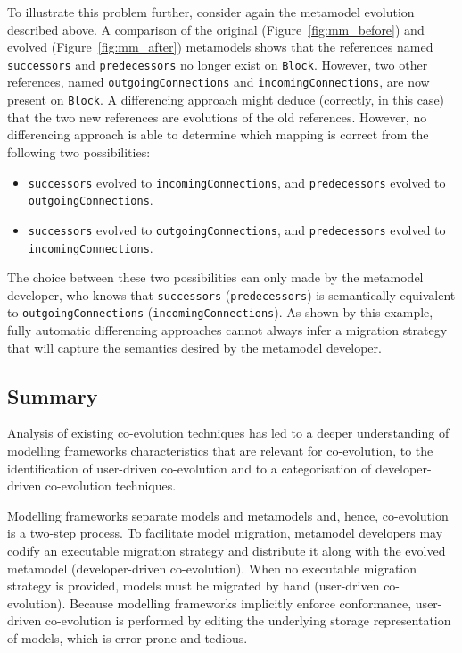 To illustrate this problem further, consider again the metamodel evolution described above. A comparison of the original (Figure~\ref{fig:mm_before}) and evolved (Figure~\ref{fig:mm_after}) metamodels shows that the references named \texttt{successors} and \texttt{predecessors} no longer exist on \texttt{Block}. However, two other references, named \texttt{out\-go\-ingCon\-nect\-ions} and \texttt{incomingConnections}, are now present on \texttt{Block}. A differencing approach might deduce (correctly, in this case) that the two new references are evolutions of the old references. However, no differencing approach is able to determine which mapping is correct from the following two possibilities:

\begin{itemize}
	\item \texttt{successors} evolved to \texttt{incomingConnections}, and \texttt{predecessors} evolved to \texttt{outgoingConnections}.
	\item \texttt{successors} evolved to \texttt{outgoingConnections}, and \texttt{predecessors} evolved to \texttt{incomingConnections}.
\end{itemize}

The choice between these two possibilities can only made by the metamodel developer, who knows that \texttt{successors} (\texttt{predecessors}) is semantically equivalent to \texttt{outgoingConnections} (\texttt{incomingConnections}). As shown by this example, fully automatic differencing approaches cannot always infer a migration strategy that will capture the semantics desired by the metamodel developer.


\subsection{Summary}
Analysis of existing co-evolution techniques has led to a deeper understanding of modelling frameworks characteristics that are relevant for co-evolution, to the identification of user-driven co-evolution and to a categorisation of developer-driven co-evolution techniques.

Modelling frameworks separate models and metamodels and, hence, co-evolution is a two-step process. To facilitate model migration, metamodel developers may codify an executable migration strategy and distribute it along with the evolved metamodel (developer-driven co-evolution). When no executable migration strategy is provided, models must be migrated by hand (user-driven co-evolution). Because modelling frameworks implicitly enforce conformance, user-driven co-evolution is performed by editing the underlying storage representation of models, which is error-prone and tedious.

